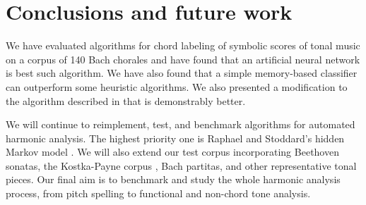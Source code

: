 \documentclass{article}
\begin{document}
\section{Conclusions and future work}
\label{sec:conclusions}

We have evaluated algorithms for chord labeling of symbolic scores of
tonal music on a corpus of 140 Bach chorales and have found that an
artificial neural network is best such algorithm. We have also found
that a simple memory-based classifier can outperform some heuristic
algorithms. We also presented a modification to the algorithm
described in \cite{pardo.ea:algorithms} that is demonstrably better.

We will continue to reimplement, test, and benchmark algorithms for
automated harmonic analysis. The highest priority one is Raphael and
Stoddard's hidden Markov model \cite{raphael.ea:harmonic}. We will
also extend our test corpus incorporating Beethoven sonatas, the
Kostka-Payne corpus \cite{temperley:bayesian}, Bach partitas, and
other representative tonal pieces. Our final aim is to benchmark and
study the whole harmonic analysis process, from pitch spelling to
functional and non-chord tone analysis.



\end{document}
